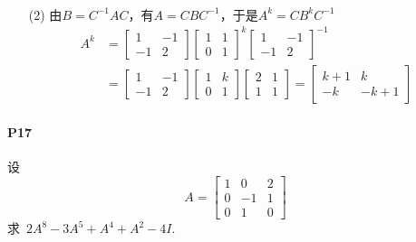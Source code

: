 \documentclass[12pt, a4paper, oneside, fontset=none]{ctexart}
\begin{document}
\begin{enumerate}
\begin{align*}
        \end{align*}
    \item[(2)] 由$B = C^{-1} A C$，有$A=CBC^{-1}$，于是$A^k=CB^kC^{-1}$
        \begin{align*}
            A^k & = \begin{bmatrix}
                        1  & -1 \\
                        -1 & 2
                    \end{bmatrix}\begin{bmatrix}
                                     1 & 1 \\
                                     0 & 1
                                 \end{bmatrix}^k \begin{bmatrix}
                                                     1  & -1 \\
                                                     -1 & 2
                                                 \end{bmatrix}^{-1}           \\
                & = \begin{bmatrix}
                        1  & -1 \\
                        -1 & 2
                    \end{bmatrix}\begin{bmatrix}
                                     1 & k \\
                                     0 & 1
                                 \end{bmatrix} \begin{bmatrix}
                                                   2 & 1 \\
                                                   1 & 1
                                               \end{bmatrix} = \begin{bmatrix}
                                                                   k + 1 & k      \\
                                                                   -k    & -k + 1
                                                               \end{bmatrix}
        \end{align*}
\end{enumerate}

\paragraph*{P17} 设
\begin{equation*}
    A = \begin{bmatrix}
        1 & 0  & 2 \\
        0 & -1 & 1 \\
        0 & 1  & 0
    \end{bmatrix}
\end{equation*}
求\ $2A^8 - 3A^5 + A^4 + A^2 -4I.$
\end{document}
